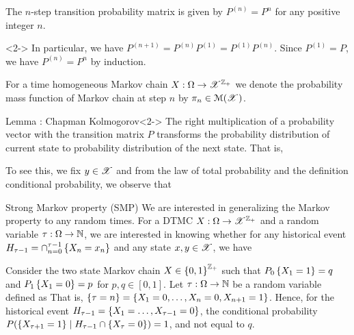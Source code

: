 \documentclass[12pt,aspectratio=169]{beamer}
\begin{document}
\begin{frame}
\begin{cor} 
The $n$-step transition probability matrix is given by $P^{(n)} = P^n$ for any positive integer $n$.
\end{cor}
\begin{Proof}<2->
In particular, we have $P^{(n+1)} = P^{(n)}P^{(1)} =  P^{(1)}P^{(n)}$. 
Since $P^{(1)} = P$, we have $P^{(n)} = P^n$ by induction. 
\end{Proof} 
\end{frame}


\begin{frame}
\begin{Definition}
For a time homogeneous Markov chain $X:\Omega\to\mathscr{X}^{\mathbb{Z}_+}$ we denote the probability mass function of Markov chain at step $n$ by $\pi_n\in \mathcal{M}(\mathscr{X})$. 
\end{Definition}
\begin{block}{Lemma : Chapman Kolmogorov}<2->
The right multiplication of a probability vector with the transition matrix $P$ transforms the probability distribution of current state to probability distribution of the next state. 
That is, 
\end{block}
\end{frame}


\begin{frame}
\begin{Proof}
To see this, we fix $y \in \mathscr{X}$ and from the law of total probability and the definition conditional probability, we observe that 
\end{Proof}
\end{frame}


\begin{frame}{Strong Markov property (SMP)}
We are interested in generalizing the Markov property to any random times. 
For a DTMC $X: \Omega \to \mathscr{X}^{\mathbb{Z}_+}$ and a random variable $\tau: \Omega \to \mathbb{N}$, 
we are interested in knowing whether for any historical event $H_{\tau-1} = \cap_{n = 0}^{\tau-1}\left\{X_n = x_n\right\}$ and any state $x, y \in \mathscr{X}$, we have 
\end{frame}


\begin{frame}
\begin{Example} 
Consider the two state Markov chain $X \in \left\{0, 1\right\}^{\mathbb{Z}_+}$ such that $P_0\left\{X_1 = 1\right\} = q$ and $P_1\left\{X_1=0\right\} = p$ for $p,q \in [0,1]$.   
Let $\tau : \Omega \to \mathbb{N}$ be a random variable defined as 
That is, $\left\{\tau = n\right\} = \left\{X_1 = 0, \dots, X_n = 0, X_{n+1} = 1\right\}$. 
Hence, for the historical event $H_{\tau-1} = \left\{X_1 = \dots, X_{\tau-1} = 0\right\}$, 
the conditional probability $P(\left\{X_{\tau+1}= 1\right\}\mid H_{\tau-1}\cap\left\{X_\tau = 0\right\}) = 1$, %
and not equal to $q$. 
\end{Example}
\end{frame}
\end{document}

